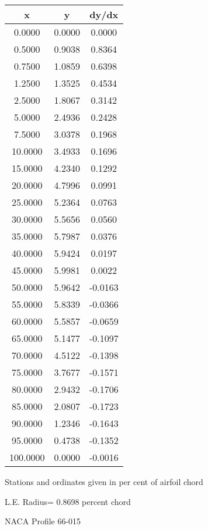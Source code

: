 \documentclass[11pt]{book}
\begin{document}
 \vspace{8mm}
 \begin{tabular}{|c|c|c|} \hline 
  x  &  y  &  dy/dx \\
 \hline
0.0000 & 0.0000 & 0.0000 \\
0.5000 & 0.9038 & 0.8364 \\
0.7500 & 1.0859 & 0.6398 \\
1.2500 & 1.3525 & 0.4534 \\
2.5000 & 1.8067 & 0.3142 \\
5.0000 & 2.4936 & 0.2428 \\
7.5000 & 3.0378 & 0.1968 \\
10.0000 & 3.4933 & 0.1696 \\
15.0000 & 4.2340 & 0.1292 \\
20.0000 & 4.7996 & 0.0991 \\
25.0000 & 5.2364 & 0.0763 \\
30.0000 & 5.5656 & 0.0560 \\
35.0000 & 5.7987 & 0.0376 \\
40.0000 & 5.9424 & 0.0197 \\
45.0000 & 5.9981 & 0.0022 \\
50.0000 & 5.9642 & -0.0163 \\
55.0000 & 5.8339 & -0.0366 \\
60.0000 & 5.5857 & -0.0659 \\
65.0000 & 5.1477 & -0.1097 \\
70.0000 & 4.5122 & -0.1398 \\
75.0000 & 3.7677 & -0.1571 \\
80.0000 & 2.9432 & -0.1706 \\
85.0000 & 2.0807 & -0.1723 \\
90.0000 & 1.2346 & -0.1643 \\
95.0000 & 0.4738 & -0.1352 \\
100.0000 & 0.0000 & -0.0016 \\
 \hline
 \end{tabular}
 \vspace{8mm}


Stations and ordinates given in per cent of airfoil chord 


L.E. Radius=  0.8698 percent chord
 \newpage
  \label{p66-015}
 \begin{Large}
 NACA Profile 66-015
 \end{Large}
  
\end{document}
